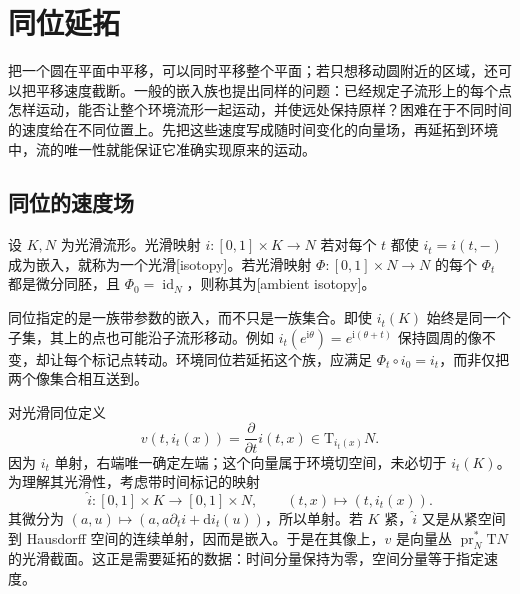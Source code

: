 
% 
% 

\section{同位延拓}
\label{g2:sec:1505}

把一个圆在平面中平移，可以同时平移整个平面；若只想移动圆附近的区域，还可以把平移速度截断。一般的嵌入族也提出同样的问题：已经规定子流形上的每个点怎样运动，能否让整个环境流形一起运动，并使远处保持原样？困难在于不同时间的速度给在不同位置上。先把这些速度写成随时间变化的向量场，再延拓到环境中，流的唯一性就能保证它准确实现原来的运动。

\subsection{同位的速度场}
\label{g2:subsec:1505:01}

\begin{definition}\label{g2:def:smooth-isotopy}
	设 \(K,N\) 为光滑流形。光滑映射 \(i:[0,1]\times K\to N\) 若对每个 \(t\) 都使 \(i_t=i(t,-)\) 成为嵌入，就称为一个光滑[isotopy]。若光滑映射 \(\Phi:[0,1]\times N\to N\) 的每个 \(\Phi_t\) 都是微分同胚，且 \(\Phi_0=\operatorname{id}_N\)，则称其为[ambient isotopy]。
\end{definition}

同位指定的是一族带参数的嵌入，而不只是一族集合。即使 \(i_t(K)\) 始终是同一个子集，其上的点也可能沿子流形移动。例如 \(i_t(e^{\mathrm i\theta})=e^{\mathrm i(\theta+t)}\) 保持圆周的像不变，却让每个标记点转动。环境同位若延拓这个族，应满足 \(\Phi_t\circ i_0=i_t\)，而非仅把两个像集合相互送到。

\ProseParagraphBreak

对光滑同位定义
\[
	v(t,i_t(x))=\frac{\partial}{\partial t}i(t,x)\in\mathrm{T}_{i_t(x)}N.
\]
因为 \(i_t\) 单射，右端唯一确定左端；这个向量属于环境切空间，未必切于 \(i_t(K)\)。为理解其光滑性，考虑带时间标记的映射
\[
	\widehat i:[0,1]\times K\longrightarrow[0,1]\times N,
	\qquad(t,x)\longmapsto(t,i_t(x)).
\]
其微分为 \((a,u)\mapsto(a,a\partial_ti+\mathrm{d}i_t(u))\)，所以单射。若 \(K\) 紧，\(\widehat i\) 又是从紧空间到 Hausdorff 空间的连续单射，因而是嵌入。于是在其像上，\(v\) 是向量丛 \(\operatorname{pr}_N^*\mathrm{T}N\) 的光滑截面。这正是需要延拓的数据：时间分量保持为零，空间分量等于指定速度。

